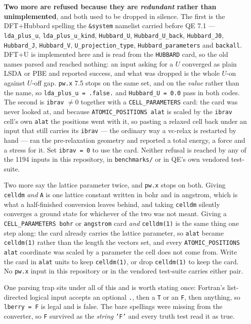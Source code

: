 \documentclass[11pt,a4paper]{article}
\newcommand{\code}[1]{\texttt{\small #1}}
\begin{document}
\begin{refuses}
\textbf{Two more are refused because they are \emph{redundant} rather than
unimplemented}, and both used to be dropped in silence. The first is the
DFT+Hubbard spelling the \code{\&system} namelist carried before QE 7.1 ---
\code{lda\_plus\_u}, \code{lda\_plus\_u\_kind}, \code{Hubbard\_U},
\code{Hubbard\_U\_back}, \code{Hubbard\_J0}, \code{Hubbard\_J},
\code{Hubbard\_V}, \code{U\_projection\_type},
\code{Hubbard\_parameters} and \code{backall}. DFT+U is implemented here and
is read from the \code{HUBBARD} card, so the old names parsed and reached
nothing: an input asking for a $U$ converged as plain LSDA or PBE and reported
success, and what was dropped is the whole $U$-on against $U$-off gap.
\code{pw.x} 7.5 stops on the same set, and on the \emph{value} rather than the
name, so \code{lda\_plus\_u = .false.} and \code{Hubbard\_U = 0.0} pass in
both codes. The second is \code{ibrav} $\neq 0$ together with a
\code{CELL\_PARAMETERS} card: the card was never looked at, and because
\code{ATOMIC\_POSITIONS alat} is scaled by the \code{ibrav} cell's own
\code{alat} the positions went with it, so pasting a relaxed cell back under an
input that still carries its \code{ibrav} --- the ordinary way a vc-relax is
restarted by hand --- ran the pre-relaxation geometry and reported a total
energy, a force and a stress for it. Set \code{ibrav = 0} to use the card.
Neither refusal is reached by any of the 1194 inputs in this repository, in
\code{benchmarks/} or in QE's own vendored test-suite.

Two more say the lattice parameter twice, and \code{pw.x} stops on both. Giving
\code{celldm} \emph{and} \code{A} is one lattice constant written in bohr and
in angstrom, which is what a half-finished conversion leaves behind, and taking
\code{celldm} silently converges a ground state for whichever of the two was
not meant. Giving a \code{CELL\_PARAMETERS bohr} or \code{angstrom} card
\emph{and} \code{celldm(1)} is the same thing one step along: the card already
carries the lattice parameter, so \code{alat} became \code{celldm(1)} rather
than the length the vectors set, and every \code{ATOMIC\_POSITIONS alat}
coordinate was scaled by a parameter the cell does not come from. Write the card
in \code{alat} units to keep \code{celldm(1)}, or drop \code{celldm(1)} to
keep the card. No \code{pw.x} input in this repository or in the vendored
test-suite carries either pair.

One parsing trap sits under all of this and is worth stating once: Fortran's
list-directed logical input accepts an optional \code{.}, then a \code{T} or
an \code{F}, then anything, so \code{lberry = F} is legal and is false. The
bare spellings were missing from the converter, so \code{F} survived as the
\emph{string} \code{'F'} and every truth test read it as true.
\end{refuses}
\end{document}
